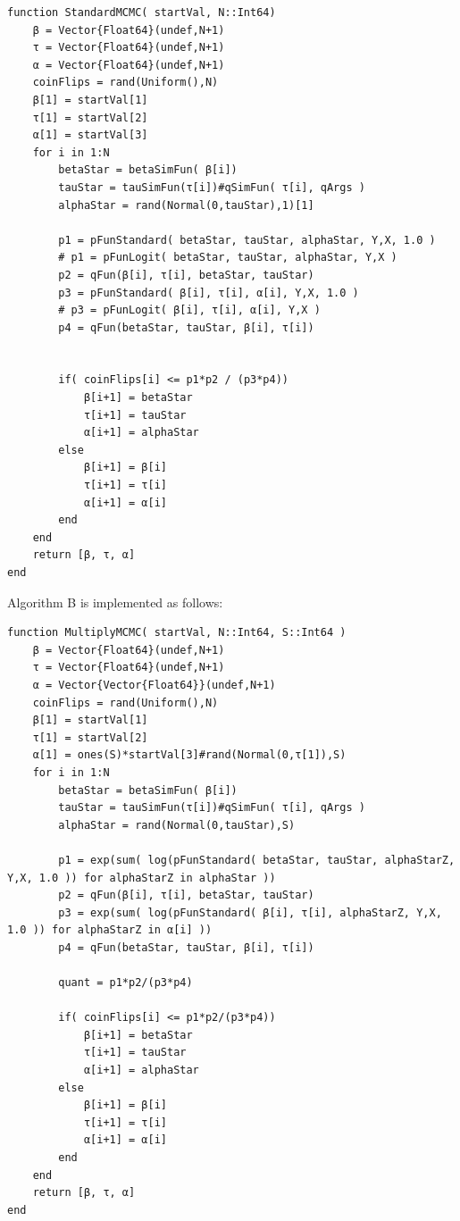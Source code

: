 \documentclass[12pt]{paper}
\begin{document}
\begin{verbatim}
function StandardMCMC( startVal, N::Int64)
    β = Vector{Float64}(undef,N+1)
    τ = Vector{Float64}(undef,N+1)
    α = Vector{Float64}(undef,N+1)
    coinFlips = rand(Uniform(),N)
    β[1] = startVal[1]
    τ[1] = startVal[2]
    α[1] = startVal[3]
    for i in 1:N
        betaStar = betaSimFun( β[i])
        tauStar = tauSimFun(τ[i])#qSimFun( τ[i], qArgs )
        alphaStar = rand(Normal(0,tauStar),1)[1]

        p1 = pFunStandard( betaStar, tauStar, alphaStar, Y,X, 1.0 )
        # p1 = pFunLogit( betaStar, tauStar, alphaStar, Y,X )
        p2 = qFun(β[i], τ[i], betaStar, tauStar)
        p3 = pFunStandard( β[i], τ[i], α[i], Y,X, 1.0 )
        # p3 = pFunLogit( β[i], τ[i], α[i], Y,X )
        p4 = qFun(betaStar, tauStar, β[i], τ[i])

               
        if( coinFlips[i] <= p1*p2 / (p3*p4))
            β[i+1] = betaStar
            τ[i+1] = tauStar
            α[i+1] = alphaStar
        else
            β[i+1] = β[i]
            τ[i+1] = τ[i]
            α[i+1] = α[i]
        end
    end
    return [β, τ, α]
end
\end{verbatim}

Algorithm B is implemented as follows:

\begin{verbatim}
function MultiplyMCMC( startVal, N::Int64, S::Int64 )
    β = Vector{Float64}(undef,N+1)
    τ = Vector{Float64}(undef,N+1)
    α = Vector{Vector{Float64}}(undef,N+1)
    coinFlips = rand(Uniform(),N)
    β[1] = startVal[1]
    τ[1] = startVal[2]
    α[1] = ones(S)*startVal[3]#rand(Normal(0,τ[1]),S)
    for i in 1:N
        betaStar = betaSimFun( β[i])
        tauStar = tauSimFun(τ[i])#qSimFun( τ[i], qArgs )
        alphaStar = rand(Normal(0,tauStar),S)

        p1 = exp(sum( log(pFunStandard( betaStar, tauStar, alphaStarZ, Y,X, 1.0 )) for alphaStarZ in alphaStar ))
        p2 = qFun(β[i], τ[i], betaStar, tauStar)
        p3 = exp(sum( log(pFunStandard( β[i], τ[i], alphaStarZ, Y,X, 1.0 )) for alphaStarZ in α[i] ))
        p4 = qFun(betaStar, tauStar, β[i], τ[i])

        quant = p1*p2/(p3*p4)
        
        if( coinFlips[i] <= p1*p2/(p3*p4))
            β[i+1] = betaStar
            τ[i+1] = tauStar
            α[i+1] = alphaStar
        else
            β[i+1] = β[i]
            τ[i+1] = τ[i]
            α[i+1] = α[i]
        end
    end
    return [β, τ, α]
end
\end{verbatim}
\end{document}
